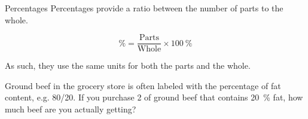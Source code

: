 \documentclass[11pt,letterpaper]{article}
\begin{document}

\begin{frame}[t]{Percentages}
	Percentages provide a \alert{ratio} between the number of parts to the
	whole.

	\begin{equation*}
		\si{\percent} = \frac{\text{Parts}}{\text{Whole}} \times \SI{100}{\percent}
	\end{equation*}

	As such, they use the same units for both the parts and the whole.
	\begin{example}
		Ground beef in the grocery store is often labeled with the
		percentage of fat content, e.g. 80/20. If you purchase
		\SI{2}{\pound} of ground beef that contains \SI{20}{\percent}
		fat, how much beef are you actually getting?
	\end{example}
\end{frame}
\end{document}
